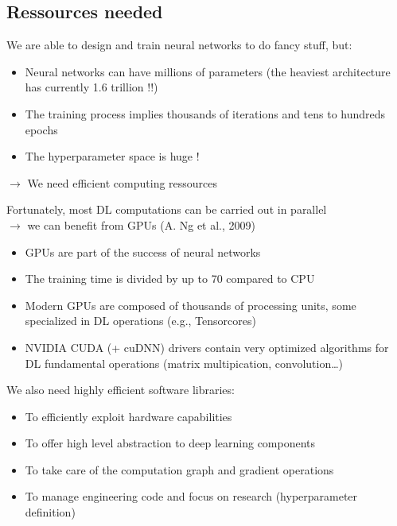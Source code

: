 \documentclass[usenames,dvipsnames]{beamer}
\begin{document}
    \subsection{Ressources needed}
    \begin{frame}{\secname}{\subsecname}
        We are able to design and train neural networks to do fancy stuff, but:
        \begin{itemize}
            \item Neural networks can have millions of parameters (the heaviest architecture has currently 1.6 trillion !!)
            \item The training process implies thousands of iterations and tens to hundreds epochs
            \item The hyperparameter space is huge !
        \end{itemize}
        \vspace{1em}
        $\rightarrow$ We need efficient computing ressources
    \end{frame}
    \begin{frame}{\secname}{\subsecname}
        Fortunately, most DL computations can be carried out in parallel\\
        $\rightarrow$ we can benefit from GPUs (A. Ng et al., 2009)
        \begin{itemize}
            \item GPUs are part of the success of neural networks
            \item The training time is divided by up to 70 compared to CPU
            \item Modern GPUs are composed of thousands of processing units, some specialized in DL operations (e.g., Tensorcores)
            \item NVIDIA CUDA (+ cuDNN) drivers contain very optimized algorithms for DL fundamental operations (matrix multipication, convolution\dots)
        \end{itemize}
    \end{frame}
    \begin{frame}{\secname}{\subsecname}
        We also need highly efficient software libraries:
        \begin{itemize}
            \item To efficiently exploit hardware capabilities
            \item To offer high level abstraction to deep learning components
            \item To take care of the computation graph and gradient operations
            \item To manage engineering code and focus on research (hyperparameter definition)
        \end{itemize}
    \end{frame}
\end{document}
